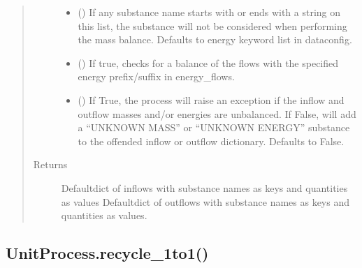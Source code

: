 \documentclass[a4paper,10pt,english]{sphinxmanual}
\begin{document}
\begin{fulllineitems}
\begin{quote}
\begin{description}
\begin{itemize}
\item {} 
 (\sphinxstyleliteralemphasis{\sphinxupquote{{[}}}\sphinxstyleliteralemphasis{\sphinxupquote{{]}}}) \textendash{} If any substance name starts with
or ends with a string on this list, the substance will not
be considered when performing the mass balance.
Defaults to energy keyword list in dataconfig.

\item {} 
 () \textendash{} If true, checks for a balance of the flows
with the specified energy prefix/suffix in energy\_flows.

\item {} 
 () \textendash{} If True, the process will raise an
exception if the inflow and outflow masses and/or energies are
unbalanced. If False, will add a “UNKNOWN MASS” or “UNKNOWN
ENERGY” substance to the offended inflow or outflow dictionary.
Defaults to False.

\end{itemize}

\item[{Returns}] \leavevmode
Defaultdict of inflows with substance names as keys and quantities as values
Defaultdict of outflows with substance names as keys and quantities as values.

\end{description}\end{quote}

\end{fulllineitems}



\subsection{UnitProcess.recycle\_1to1()}
\label{\detokenize{unit:unitprocess-recycle-1to1}}
\end{document}
